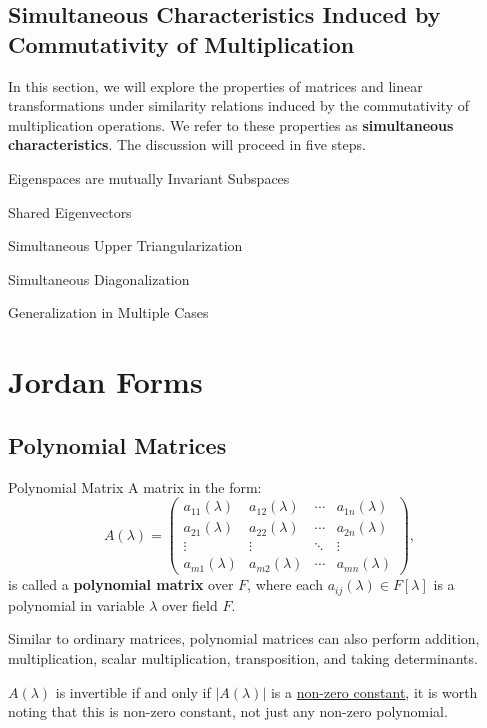 \documentclass[11pt]{../../TexTemplate/elegantbook} %
\begin{document}
\section{Simultaneous Characteristics Induced by Commutativity of Multiplication}
In this section, we will explore the properties of matrices and linear transformations under 
similarity relations induced by the commutativity of multiplication operations. 
We refer to these properties as \textbf{simultaneous characteristics}. The discussion will proceed in five steps.

\begin{leftbarTitle}{Eigenspaces are mutually Invariant Subspaces}\end{leftbarTitle}

\begin{leftbarTitle}{Shared Eigenvectors}\end{leftbarTitle}

\begin{leftbarTitle}{Simultaneous Upper Triangularization}\end{leftbarTitle}

\begin{leftbarTitle}{Simultaneous Diagonalization}\end{leftbarTitle}

\begin{leftbarTitle}{Generalization in Multiple Cases}\end{leftbarTitle}


\chapter{Jordan Forms}
\section{Polynomial Matrices}
\begin{definition}{Polynomial Matrix}
    A matrix in the form:
    \[
    A(\lambda) = 
    \begin{pmatrix}
        a_{11}(\lambda) & a_{12}(\lambda) & \cdots & a_{1n}(\lambda) \\
        a_{21}(\lambda) & a_{22}(\lambda) & \cdots & a_{2n}(\lambda) \\
        \vdots & \vdots & \ddots & \vdots \\
        a_{m1}(\lambda) & a_{m2}(\lambda) & \cdots & a_{mn}(\lambda)
    \end{pmatrix},
    \]
    is called a \textbf{polynomial matrix} over \( F \),
    where each \( a_{ij}(\lambda) \in F[\lambda] \) is a polynomial in variable \( \lambda \) over field \( F \).
\end{definition}
Similar to ordinary matrices,
polynomial matrices can also perform addition, multiplication, scalar multiplication, transposition, and taking determinants.
\begin{caution}
    \(A (\lambda)\) is invertible if and only if \( |A(\lambda)| \) is a \underline{non-zero constant},
    it is worth noting that this is non-zero constant, not just any non-zero polynomial.
\end{caution}
\end{document}
